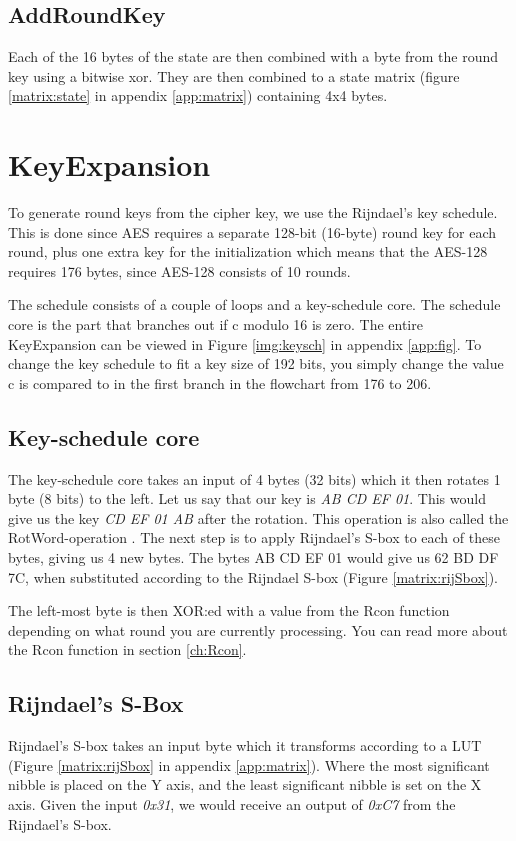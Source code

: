 \subsection{AddRoundKey}
Each of the 16 bytes of the state are then combined with a byte from 
the round key using a bitwise xor. They are then combined to a state 
matrix (figure \ref{matrix:state} in appendix \ref{app:matrix}) 
containing 4x4 bytes.

\section{KeyExpansion}\label{sec:KeySch}
To generate round keys from the cipher key, we use the Rijndael's key 
schedule. This is done since AES requires a separate 128-bit (16-byte) 
round key for each round, plus one extra key for the initialization 
which means that the AES-128 requires 176 bytes, since AES-128 consists 
of 10 rounds.

The schedule consists of a couple of loops and a key-schedule core. The 
schedule core is the part that branches out if c modulo 16 is zero. 
The entire KeyExpansion can be viewed in Figure \ref{img:keysch} in 
appendix \ref{app:fig}. To change the key schedule to fit a key size of 
192 bits, you simply change the value c is compared to in the first 
branch in the flowchart from 176 to 206.

\subsection{Key-schedule core}\label{sec:kCore}
The key-schedule core takes an input of 4 bytes (32 bits) which it then 
rotates 1 byte (8 bits) to the left. Let us say that our key is 
\emph{AB CD EF 01}. This would give us the key \emph{CD EF 01 AB} after 
the rotation. This operation is also called the RotWord-operation 
\citep[p. 107]{Stinson:2006}. The next step is to apply Rijndael's 
S-box to each of these bytes, giving us 4 new bytes. The bytes 
{AB CD EF 01} would give us {62 BD DF 7C}, when substituted according 
to the Rijndael S-box (Figure \ref{matrix:rijSbox}).

The left-most byte is then XOR:ed with a value from the Rcon function 
depending on what round you are currently processing. You can read more 
about the Rcon function in section \ref{ch:Rcon}.

\subsection{Rijndael's S-Box}
Rijndael's S-box takes an input byte which it transforms according to a 
LUT (Figure \ref{matrix:rijSbox} in appendix \ref{app:matrix}). Where 
the most significant nibble is placed on the Y axis, and the least 
significant nibble is set on the X axis. Given the input \emph{0x31}, 
we would receive an output of \emph{0xC7} from the Rijndael's S-box.

